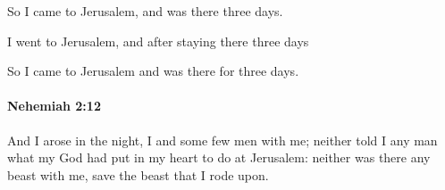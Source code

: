			\begin{versebox}
					\item[BHS] 
					\item[LXX] 
					\item[ASV] So I came to Jerusalem, and was there three days.
					\item[NIV] I went to Jerusalem, and after staying there three days
					\item[NRSV] So I came to Jerusalem and was there for three days.
			\end{versebox}

		\paragraph{Nehemiah 2:12} %
			\label{NEHEMIAH-2-12}

			And I arose in the night, I and some few men with me; neither told I any man what my God had put in my heart to do at Jerusalem: neither was there any beast with me, save the beast that I rode upon.

